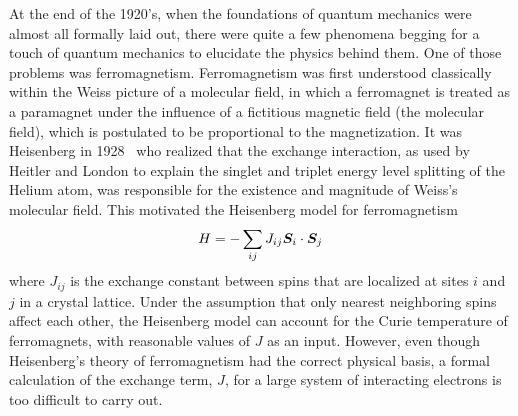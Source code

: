 At the end of the 1920's, when the foundations of quantum mechanics were almost
all formally laid out, there were quite a few phenomena begging for a touch of
quantum mechanics to elucidate the physics behind them.  One of those problems
was ferromagnetism.    Ferromagnetism was first understood classically within
the Weiss picture of a molecular field,   in which a ferromagnet is treated as
a paramagnet under the influence of a fictitious magnetic field (the molecular
field), which is postulated to be proportional to the magnetization.  It was
Heisenberg in 1928~\cite{Heisenberg:1928:TFG} who realized that the exchange
interaction, as used by Heitler and London to explain the singlet and triplet
energy level splitting of the Helium atom, was responsible for the existence
and magnitude of Weiss's molecular field.   This motivated the Heisenberg model for ferromagnetism 
\begin{equation}
   H = -\sum_{ij} J_{ij} \bm{S}_{i} \cdot \bm{S}_{j} 
\end{equation} 
where $J_{ij}$ is the exchange constant between spins  that are localized at
sites  $i$  and $j$ in a crystal lattice.  Under the assumption that only
nearest neighboring spins affect each other, the Heisenberg model can account
for the Curie temperature of ferromagnets, with reasonable values of $J$ as an
input.  However, even though Heisenberg's theory of ferromagnetism had the
correct physical basis, a formal calculation of the exchange term, $J$, for a
large system of interacting electrons is too difficult to carry out.  



%


